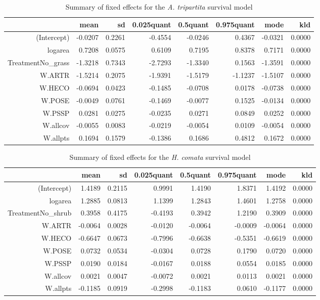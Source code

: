 \documentclass[11pt]{article}
\begin{document}
\begin{table}[ht]
\centering
\caption{Summary of fixed effects for the \textit{A. tripartita} survival model} 
\label{ARTRsurvival}
\begin{tabular}{rrrrrrrr}
  \hline
 & mean & sd & 0.025quant & 0.5quant & 0.975quant & mode & kld \\ 
  \hline
(Intercept) & -0.0207 & 0.2261 & -0.4554 & -0.0246 & 0.4367 & -0.0321 & 0.0000 \\ 
  logarea & 0.7208 & 0.0575 & 0.6109 & 0.7195 & 0.8378 & 0.7171 & 0.0000 \\ 
  TreatmentNo\_grass & -1.3218 & 0.7343 & -2.7293 & -1.3340 & 0.1563 & -1.3591 & 0.0000 \\ 
  W.ARTR & -1.5214 & 0.2075 & -1.9391 & -1.5179 & -1.1237 & -1.5107 & 0.0000 \\ 
  W.HECO & -0.0694 & 0.0423 & -0.1485 & -0.0708 & 0.0178 & -0.0738 & 0.0000 \\ 
  W.POSE & -0.0049 & 0.0761 & -0.1469 & -0.0077 & 0.1525 & -0.0134 & 0.0000 \\ 
  W.PSSP & 0.0281 & 0.0275 & -0.0235 & 0.0271 & 0.0849 & 0.0252 & 0.0000 \\ 
  W.allcov & -0.0055 & 0.0083 & -0.0219 & -0.0054 & 0.0109 & -0.0054 & 0.0000 \\ 
  W.allpts & 0.1694 & 0.1579 & -0.1386 & 0.1686 & 0.4812 & 0.1672 & 0.0000 \\ 
   \hline
\end{tabular}
\end{table}

\begin{table}[ht]
\centering
\caption{Summary of fixed effects for the \textit{H. comata} survival model} 
\label{HECOsurvival}
\begin{tabular}{rrrrrrrr}
  \hline
 & mean & sd & 0.025quant & 0.5quant & 0.975quant & mode & kld \\ 
  \hline
(Intercept) & 1.4189 & 0.2115 & 0.9991 & 1.4190 & 1.8371 & 1.4192 & 0.0000 \\ 
  logarea & 1.2885 & 0.0813 & 1.1399 & 1.2843 & 1.4601 & 1.2758 & 0.0000 \\ 
  TreatmentNo\_shrub & 0.3958 & 0.4175 & -0.4193 & 0.3942 & 1.2190 & 0.3909 & 0.0000 \\ 
  W.ARTR & -0.0064 & 0.0028 & -0.0120 & -0.0064 & -0.0009 & -0.0064 & 0.0000 \\ 
  W.HECO & -0.6647 & 0.0673 & -0.7996 & -0.6638 & -0.5351 & -0.6619 & 0.0000 \\ 
  W.POSE & 0.0732 & 0.0534 & -0.0304 & 0.0728 & 0.1790 & 0.0720 & 0.0000 \\ 
  W.PSSP & 0.0190 & 0.0184 & -0.0167 & 0.0188 & 0.0554 & 0.0185 & 0.0000 \\ 
  W.allcov & 0.0021 & 0.0047 & -0.0072 & 0.0021 & 0.0113 & 0.0021 & 0.0000 \\ 
  W.allpts & -0.1185 & 0.0919 & -0.2998 & -0.1183 & 0.0610 & -0.1177 & 0.0000 \\ 
   \hline
\end{tabular}
\end{table}
\end{document}
